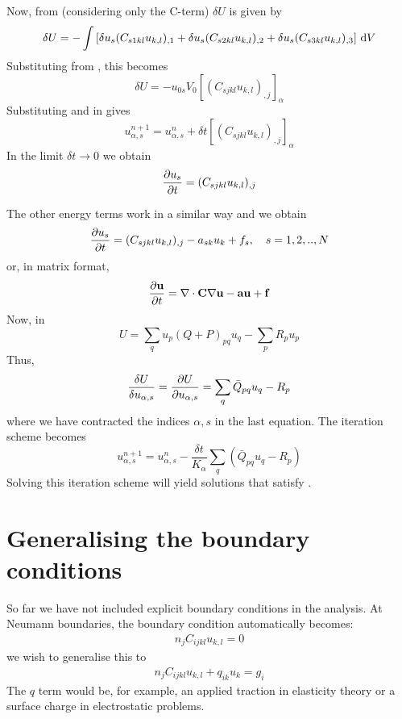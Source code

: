 \documentclass[a4paper]{article}
\begin{document}
Now, from  (considering only the C-term) $\delta U$ is given by
\begin{equation}
  \delta U=-\int \left[\delta u_s(C_{s1kl} u_{k,l})_{,1}
    +\delta u_s(C_{s2kl} u_{k,l})_{,2}
    +\delta u_s(C_{s3kl} u_{k,l})_{,3}\right]\,\mathrm{d} V
\end{equation}
Substituting from , this becomes
\begin{equation}
  \delta U=-u_{0s} V_0[(C_{sjkl} u_{k,l})_{,j}]_\alpha
\label{dU2}
\end{equation}
Substituting  and  in  gives
\begin{equation}
  u_{\alpha,s}^{n+1}=u_{\alpha,s}^n+\delta t [(C_{sjkl} u_{k,l})_{,j}]_\alpha
\end{equation}
In the limit $\delta t\to 0$ we obtain
\begin{equation}
  \frac{\partial u_s}{\partial t}=(C_{sjkl} u_{k,l})_{,j}
\end{equation}

The other energy terms work in a similar way and we obtain
\begin{equation}
  \frac{\partial u_s}{\partial t}=(C_{sjkl}u_{k,l})_{,j}-a_{sk}u_k+f_s,~~~s=1,2,..,N
\label{tpde}
\end{equation}
or, in matrix format,
\begin{equation}
  \frac{\partial\mathbf{u}}{\partial t}=\nabla\cdot \mathbf{C}\nabla\mathbf{u}-\mathbf{a}\mathbf{u}+\mathbf{f}
\end{equation}
Now, in 
\begin{equation}
  U=\sum_q u_p (Q+P)_{pq} u_q-\sum_p R_p u_p
\end{equation}
Thus,
\begin{equation}
  \frac{\delta U}{\delta u_{\alpha,s}}=\frac{\partial U}{\partial u_{\alpha,s}}=
\sum_q \bar Q_{pq} u_{q}-R_p
\end{equation}
where we have contracted the indices $\alpha,s$ in the last equation.
The iteration scheme  becomes
\begin{equation}
  u_{\alpha,s}^{n+1}=u_{\alpha,s}^n-
  \frac{\delta t}{K_\alpha} \sum_q (\bar Q_{pq} u_{q}-R_p)
\end{equation}
Solving this iteration scheme will yield solutions that satisfy .

\section{Generalising the boundary conditions}

So far we have not included explicit boundary conditions in the
analysis. At Neumann boundaries, the boundary condition automatically
becomes:
\begin{eqnarray}
  n_jC_{ijkl}u_{k,l}=0
\end{eqnarray}
we wish to generalise this to
\begin{eqnarray}
  n_jC_{ijkl}u_{k,l}+q_{ik}u_k=g_i
\end{eqnarray}
The $q$ term would be, for example, an applied traction in elasticity
theory or a surface charge in electrostatic problems.
\end{document}
